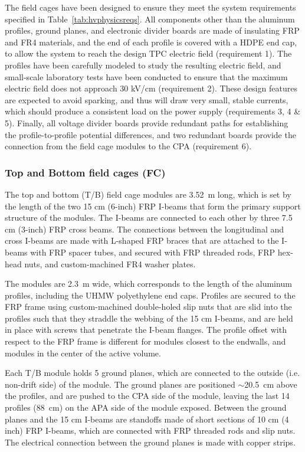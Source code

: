 The field cages have been designed to ensure they meet the system requirements specified in Table~\ref{tab:hvphysicsreqs}. All components other than the aluminum profiles, ground planes, and electronic divider boards are made of insulating FRP and FR4 materials, and the end of each profile is covered with a HDPE end cap, to allow the system to reach the design TPC electric field (requirement 1). The profiles have been carefully modeled to study the resulting electric field, and small-scale laboratory tests have been conducted to ensure that the maximum electric field does not approach 30 kV/cm (requirement 2). These design features are expected to avoid sparking, and thus will draw very small, stable currents, which should produce a consistent load on the power supply (requirements 3, 4 \& 5). Finally, all voltage divider boards provide redundant paths for establishing the profile-to-profile potential differences, and two redundant boards provide the connection from the field cage modules to the CPA (requirement 6).

\subsubsection{Top and Bottom field cages (FC)}

The top and bottom (T/B) field cage modules are 3.52~m long, which is set by the length of the two 15 cm (6-inch) FRP I-beams that form the primary support structure of the modules. The I-beams are connected to each other by three  7.5 cm (3-inch) FRP cross beams. The connections between the longitudinal and cross I-beams are made with L-shaped FRP braces that are attached to the I-beams with FRP spacer tubes, and secured with FRP threaded rods, FRP hex-head nuts, and custom-machined FR4 washer plates.

The modules are 2.3~m wide, which corresponds to the length of the aluminum profiles, including the UHMW polyethylene end caps. Profiles are secured to the FRP frame using custom-machined double-holed slip nuts that are slid into the profiles such that they straddle the webbing of the 15 cm I-beams, and are held in place with screws that penetrate the I-beam flanges. The profile offset with respect to the FRP frame is different for modules closest to the endwalls, and modules in the center of the active volume.

Each T/B module holds 5 ground planes, which are connected to the outside (i.e. non-drift side) of the module. The ground planes are positioned $\sim$20.5~cm above the profiles, and are pushed to the CPA side of the module, leaving the last 14 profiles (88~cm) on the APA side of the module exposed. Between the ground planes and the 15 cm I-beams are standoffs made of short sections of 10 cm (4 inch)  FRP I-beams, which are connected with FRP threaded rods and slip nuts. The electrical connection between the ground planes is made with copper strips.

